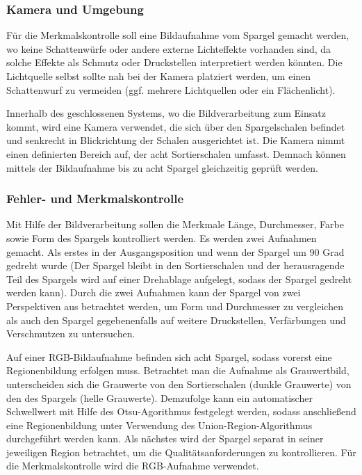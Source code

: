 \documentclass{ezb}
\begin{document}
\subsubsection*{Kamera und Umgebung}
Für die Merkmalskontrolle soll eine Bildaufnahme vom Spargel gemacht werden, wo keine Schattenwürfe oder andere externe Lichteffekte vorhanden sind, da solche Effekte als Schmutz oder Druckstellen interpretiert werden könnten. Die Lichtquelle selbst sollte nah bei der Kamera platziert werden, um einen Schattenwurf zu vermeiden (ggf. mehrere Lichtquellen oder ein Flächenlicht). 

Innerhalb des geschlossenen Systems, wo die Bildverarbeitung zum Einsatz kommt, wird eine Kamera verwendet, die sich über den Spargelschalen befindet und senkrecht in Blickrichtung der Schalen ausgerichtet ist. Die Kamera nimmt einen definierten Bereich auf, der acht Sortierschalen umfasst. Demnach können mittels der Bildaufnahme bis zu acht Spargel gleichzeitig geprüft werden.

\subsubsection*{Fehler- und Merkmalskontrolle}
Mit Hilfe der Bildverarbeitung sollen die Merkmale Länge, Durchmesser, Farbe sowie Form des Spargels kontrolliert werden. Es werden zwei Aufnahmen gemacht. Als erstes in der Ausgangsposition und wenn der Spargel um 90 Grad gedreht wurde (Der Spargel bleibt in den Sortierschalen und der herausragende Teil des Spargels wird auf einer Drehablage aufgelegt, sodass der Spargel gedreht werden kann). Durch die zwei Aufnahmen kann der Spargel von zwei Perspektiven aus betrachtet werden, um Form und Durchmesser zu vergleichen als auch den Spargel gegebenenfalls auf weitere Druckstellen, Verfärbungen und Verschmutzen zu untersuchen.

Auf einer RGB-Bildaufnahme befinden sich acht Spargel, sodass vorerst eine Regionenbildung erfolgen muss. Betrachtet man die Aufnahme als Grauwertbild, unterscheiden sich die Grauwerte von den Sortierschalen (dunkle Grauwerte) von den des Spargels (helle Grauwerte). Demzufolge kann ein automatischer Schwellwert mit Hilfe des Otsu-Agorithmus festgelegt werden, sodass anschließend eine Regionenbildung unter Verwendung des Union-Region-Algorithmus durchgeführt werden kann. Als nächstes wird der Spargel separat in seiner jeweiligen Region betrachtet, um die Qualitätsanforderungen zu kontrollieren. Für die Merkmalskontrolle wird die RGB-Aufnahme verwendet.
\end{document}
